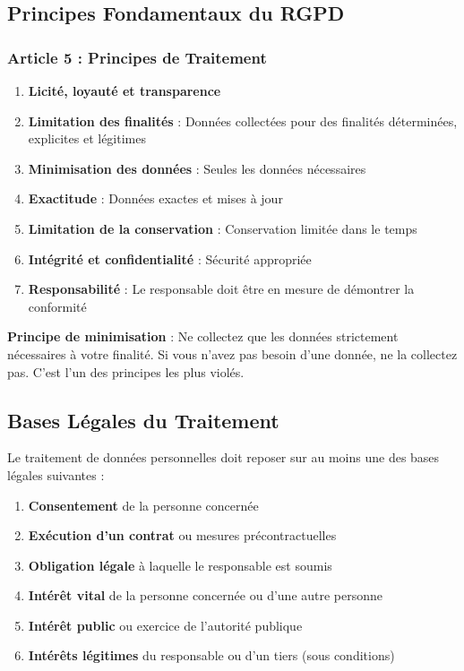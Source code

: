 \documentclass[11pt,a4paper]{article}
\begin{document}
\subsection{Principes Fondamentaux du RGPD}

\subsubsection{Article 5 : Principes de Traitement}

\begin{enumerate}
    \item \textbf{Licité, loyauté et transparence}
    \item \textbf{Limitation des finalités} : Données collectées pour des finalités déterminées, explicites et légitimes
    \item \textbf{Minimisation des données} : Seules les données nécessaires
    \item \textbf{Exactitude} : Données exactes et mises à jour
    \item \textbf{Limitation de la conservation} : Conservation limitée dans le temps
    \item \textbf{Intégrité et confidentialité} : Sécurité appropriée
    \item \textbf{Responsabilité} : Le responsable doit être en mesure de démontrer la conformité
\end{enumerate}

\begin{importantbox}
\textbf{Principe de minimisation} : Ne collectez que les données strictement nécessaires à votre finalité. Si vous n'avez pas besoin d'une donnée, ne la collectez pas. C'est l'un des principes les plus violés.
\end{importantbox}

\subsection{Bases Légales du Traitement}

Le traitement de données personnelles doit reposer sur au moins une des bases légales suivantes :

\begin{enumerate}
    \item \textbf{Consentement} de la personne concernée
    \item \textbf{Exécution d'un contrat} ou mesures précontractuelles
    \item \textbf{Obligation légale} à laquelle le responsable est soumis
    \item \textbf{Intérêt vital} de la personne concernée ou d'une autre personne
    \item \textbf{Intérêt public} ou exercice de l'autorité publique
    \item \textbf{Intérêts légitimes} du responsable ou d'un tiers (sous conditions)
\end{enumerate}
\end{document}
